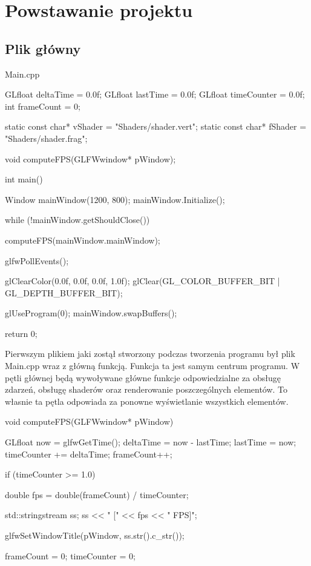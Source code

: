 \documentclass[a4paper,12pt]{article}
\numberwithin{equation}{section}
\begin{document}
\section{Powstawanie projektu}

\subsection{Plik główny}

\begin{center}
    Main.cpp
\end{center}

\begin{cppcode}
GLfloat deltaTime = 0.0f;
GLfloat lastTime = 0.0f;
GLfloat timeCounter = 0.0f;
int frameCount = 0;

static const char* vShader = "Shaders/shader.vert";
static const char* fShader = "Shaders/shader.frag";

void computeFPS(GLFWwindow* pWindow);

int main()
{
	Window mainWindow(1200, 800);
	mainWindow.Initialize();

	while (!mainWindow.getShouldClose())
	{
		computeFPS(mainWindow.mainWindow);

		glfwPollEvents();

		glClearColor(0.0f, 0.0f, 0.0f, 1.0f);
		glClear(GL_COLOR_BUFFER_BIT | GL_DEPTH_BUFFER_BIT);

		glUseProgram(0);
		mainWindow.swapBuffers();
	}

	return 0;
}
\end{cppcode}

Pierwszym plikiem jaki zostął stworzony podczas tworzenia programu był plik Main.cpp wraz z główną funkcją. Funkcja ta jest samym centrum programu. W pętli głównej będą wywoływane główne funkcje odpowiedzialne za obsługę zdarzeń, obsługę shaderów oraz renderowanie poszczególnych elementów.
To własnie ta pętla odpowiada za ponowne wyświetlanie wszystkich elementów.

\begin{cppcode}

void computeFPS(GLFWwindow* pWindow)
{
	GLfloat now = glfwGetTime();
	deltaTime = now - lastTime;
	lastTime = now;
	timeCounter += deltaTime;
	frameCount++;

	if (timeCounter >= 1.0) {
		double fps = double(frameCount) / timeCounter;

		std::stringstream ss;
		ss << " [" << fps << " FPS]";

		glfwSetWindowTitle(pWindow, ss.str().c_str());

		frameCount = 0;
		timeCounter = 0;
	}
}
\end{cppcode}
\end{document}
